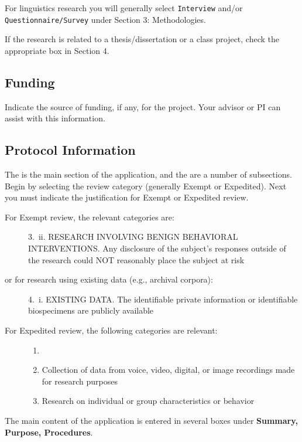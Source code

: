 \documentclass[
]{book}
\providecommand{\tightlist}{%
  \setlength{\itemsep}{0pt}\setlength{\parskip}{0pt}}
\begin{document}
For linguistics research you will generally select \texttt{Interview} and/or \texttt{Questionnaire/Survey} under Section 3: Methodologies.

If the research is related to a thesis/dissertation or a class project, check the appropriate box in Section 4.

\hypertarget{funding-1}{%
\subsection{Funding}\label{funding-1}}

Indicate the source of funding, if any, for the project. Your advisor or PI can assist with this information.

\hypertarget{protocol-information}{%
\subsection{Protocol Information}\label{protocol-information}}

The is the main section of the application, and the are a number of subsections. Begin by selecting the review category (generally Exempt or Expedited). Next you must indicate the justification for Exempt or Expedited review.

\begin{description}
\item[For Exempt review, the relevant categories are:]
3.~ii. RESEARCH INVOLVING BENIGN BEHAVIORAL INTERVENTIONS. Any disclosure of the subject's responses outside of the research could NOT reasonably place the subject at risk
\item[or for research using existing data (e.g., archival corpora):]
4.~i. EXISTING DATA. The identifiable private information or identifiable biospecimens are publicly available
\item[For Expedited review, the following categories are relevant:]
\begin{enumerate}
\def\labelenumi{\arabic{enumi}.}
\setcounter{enumi}{5}
\tightlist
\item[]
\item
  Collection of data from voice, video, digital, or image recordings made for research purposes
\item
  Research on individual or group characteristics or behavior
\end{enumerate}
\end{description}

The main content of the application is entered in several boxes under \textbf{Summary, Purpose, Procedures}.
\end{document}
